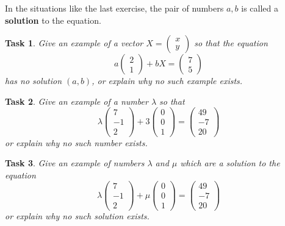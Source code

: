 \documentclass[10pt,]{book}
\newcommand{\terminology}[1]{\textbf{#1}}
\theoremstyle{plain}
\numberwithin{equation}{section}
\newtheorem{task}{Task}[chapter]
\begin{document}
In the situations like the last exercise, the pair of numbers \(a, b\) is called a \terminology{solution} to the equation.%
\begin{task}
\label{task-5}
Give an example of a vector \(X = \left( \begin{smallmatrix} x \\ y \end{smallmatrix} \right)\) so that the equation \[a \begin{pmatrix} 2 \\ 1 \end{pmatrix} + b X = \begin{pmatrix}7 \\ 5 \end{pmatrix} \] has no solution \((a,b)\), or explain why no such example exists.%
\end{task}
\begin{task}
\label{task-6}
Give an example of a number \(\lambda\) so that \[\lambda \begin{pmatrix} 7 \\ -1 \\ 2 \end{pmatrix} + 3 \begin{pmatrix} 0 \\ 0 \\ 1 \end{pmatrix} = \begin{pmatrix} 49 \\ -7 \\ 20 \end{pmatrix}\] or explain why no such number exists.%
\end{task}
\begin{task}
\label{task-7}
Give an example of numbers \(\lambda\) and \(\mu\) which are a solution to the equation \[ \lambda \begin{pmatrix} 7 \\ -1 \\ 2 \end{pmatrix} + \mu \begin{pmatrix} 0 \\ 0 \\ 1 \end{pmatrix} = \begin{pmatrix} 49 \\ -7 \\ 20 \end{pmatrix}\] or explain why no such solution exists.%
\end{task}
\end{document}
